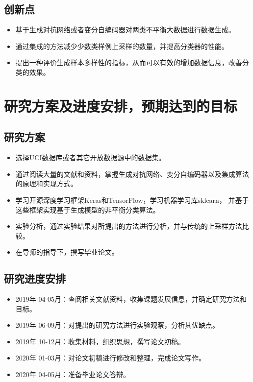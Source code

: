 \documentclass{article}
\begin{document}
\subsection{创新点}
\begin{itemize}
    \item 
    基于生成对抗网络或者变分自编码器对两类不平衡大数据进行数据生成。
    \item 
    通过集成的方法减少少数类样例上采样的数量，并提高分类器的性能。
    \item 
    提出一种评价生成样本多样性的指标，从而可以有效的增加数据信息，改善分类的效果。
\end{itemize}



\section{研究方案及进度安排，预期达到的目标}

\subsection{研究方案}
\begin{itemize}
    \item 
    选择UCI数据库或者其它开放数据源中的数据集。
    \item 
    通过阅读大量的文献和资料，掌握生成对抗网络、变分自编码器以及集成算法的原理和实现方式。
    \item 
    学习开源深度学习框架Keras和TensorFlow，学习机器学习库sklearn，
    并基于这些框架实现基于生成模型的非平衡分类算法。
    \item 
    实验分析，通过实验结果对所提出的方法进行分析，并与传统的上采样方法比较。
    \item 
    在导师的指导下，撰写毕业论文。 
\end{itemize}

\subsection{研究进度安排}
\begin{itemize}
    \item 2019年 04-05月：查阅相关文献资料，收集课题发展信息，并确定研究方法和目标。
    \item 2019年 06-09月：对提出的研究方法进行实验观察，分析其优缺点。
    \item 2019年 10-12月：收集材料，组织思想，撰写论文初稿。
    \item 2020年 01-03月：对论文初稿进行修改和整理，完成论文写作。
    \item 2020年 04-05月：准备毕业论文答辩。
\end{itemize}
\end{document}
